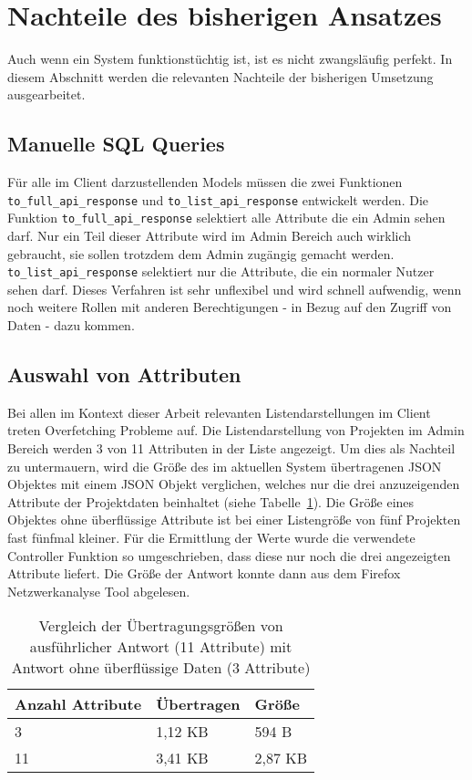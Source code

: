 \section{Nachteile des bisherigen Ansatzes}
\label{sec:requirements:cons:typescript}
Auch wenn ein System funktionstüchtig ist, ist es nicht zwangsläufig perfekt.
In diesem Abschnitt werden die relevanten Nachteile der bisherigen Umsetzung ausgearbeitet.

\subsection{Manuelle SQL Queries}
Für alle im Client darzustellenden Models müssen die zwei Funktionen \texttt{to\_full\-\_api\-\_re\-sponse} und \texttt{to\_list\_api\_response} entwickelt werden.
Die Funktion \texttt{to\-\_full\-\_api\-\_response} selektiert alle Attribute die ein Admin sehen darf. Nur ein Teil dieser Attribute wird im Admin Bereich auch wirklich gebraucht, sie sollen trotzdem dem Admin zugängig gemacht werden.
\texttt{to\-\_list\-\_api\-\_response} selektiert nur die Attribute, die ein normaler Nutzer sehen darf. Dieses Verfahren ist sehr unflexibel und wird schnell aufwendig, wenn noch weitere Rollen mit anderen Berechtigungen - in Bezug auf den Zugriff von Daten - dazu kommen.

\subsection{Auswahl von Attributen}
\label{sec:requirements:cons:attributes}
Bei allen im Kontext dieser Arbeit relevanten Listendarstellungen im Client treten Overfetching Probleme auf.
Die Listendarstellung von Projekten im Admin Bereich werden 3 von 11 Attributen in der Liste angezeigt. 
Um dies als Nachteil zu untermauern, wird die Größe des im aktuellen System übertragenen JSON Objektes mit einem JSON Objekt verglichen, welches nur die drei anzuzeigenden Attribute der Projektdaten beinhaltet (siehe Tabelle~\ref{tbl:req:data-transfer}). Die Größe eines Objektes ohne überflüssige Attribute ist bei einer Listengröße von fünf Projekten fast fünfmal kleiner.
Für die Ermittlung der Werte wurde die verwendete Controller Funktion so umgeschrieben, dass diese nur noch die drei angezeigten Attribute liefert. Die Größe der Antwort konnte dann aus dem Firefox Netzwerkanalyse Tool abgelesen.

\begin{table}[h!]
	\begin{tabular}{|p{}|p{}|p{}|}
		\hline
		\textbf{Anzahl Attribute} & \textbf{Übertragen}  & \textbf{Größe} \\ \hline
		3 & 1,12 KB & 594 B \\ \hline
		11 & 3,41 KB & 2,87 KB \\ \hline
	\end{tabular}
	\vspace{5pt}
	\caption{Vergleich der Übertragungsgrößen von ausführlicher Antwort (11 Attribute) mit Antwort ohne überflüssige Daten (3 Attribute)}
	\label{tbl:req:data-transfer}
\end{table}


